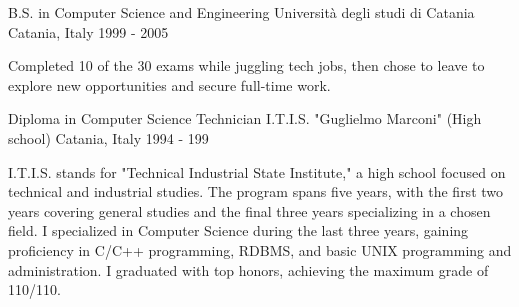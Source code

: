 

\begin{cventries}

  \cventry
  {B.S. in Computer Science and Engineering} %
  {Università degli studi di Catania} %
  {Catania, Italy} %
  {1999 - 2005} %
  {
    \begin{cvitems} %
      Completed 10 of the 30 exams while juggling tech jobs, then chose to leave to explore new opportunities and secure full-time work.
    \end{cvitems}
  }

  \cventry
  {Diploma in Computer Science Technician}
  {I.T.I.S. "Guglielmo Marconi" (High school)} %
  {Catania, Italy} %
  {1994 - 199} %
  {
    \begin{cvitems} %
      I.T.I.S. stands for "Technical Industrial State Institute," a high school focused on technical and industrial studies.
      The program spans five years, with the first two years covering general studies and the final three years specializing in a chosen field.
      I specialized in Computer Science during the last three years, gaining proficiency in C/C++ programming,
      RDBMS, and basic UNIX programming and administration.
      I graduated with top honors, achieving the maximum grade of 110/110.
    \end{cvitems}
  }

\end{cventries}
